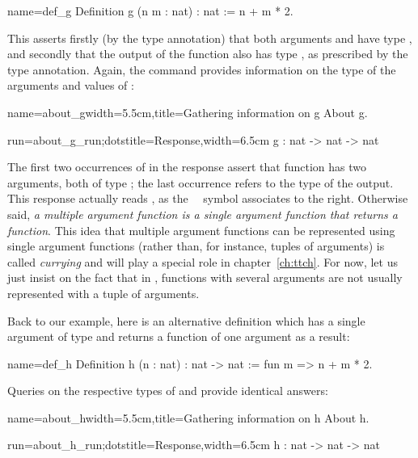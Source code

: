 \begin{coq}{name=def_g}{}
Definition g (n m : nat) : nat := n + m * 2.
\end{coq}
This asserts firstly
(by the  type annotation)
that both arguments  and  have type ,
and secondly that the
output of the function also has type , as prescribed by the
 type annotation. Again, the   command
provides information on the type of the arguments and values of
:

\begin{coq-left}{name=about_g}{width=5.5cm,title=Gathering information on g}
About g.
\end{coq-left}
\begin{coqout-right}{run=about_g_run;dots}{title=Response,width=6.5cm}
g : nat -> nat -> nat
\end{coqout-right}

The first two occurrences of  in the response
  assert that function  has two arguments,
 both of type ; the last occurrence refers to the type of
 the output. This response actually reads ,
 as the\ \ \C{->} symbol associates to the right. Otherwise said,
 {\em a multiple
 argument function is a single argument function that returns a
 function}.  This idea that multiple argument functions can be
represented using single argument functions (rather than, for instance,
tuples of arguments) is called {\em currying} and will play a special
role in chapter~\ref{ch:ttch}. For now, let us just insist on the fact
that in \Coq{}, functions with several arguments are not usually
represented with a tuple of arguments.


Back to our example, here is an alternative definition
  which has a single argument  of type  and returns
 a function of one argument as a result:

\begin{coq}{name=def_h}{}
Definition h (n : nat) : nat -> nat := fun m => n + m * 2.
\end{coq}

Queries on the respective types of  and  provide identical answers:

\begin{coq-left}{name=about_h}{width=5.5cm,title=Gathering information on h}
About h.
\end{coq-left}
\begin{coqout-right}{run=about_h_run;dots}{title=Response,width=6.5cm}
h : nat -> nat -> nat
\end{coqout-right}

